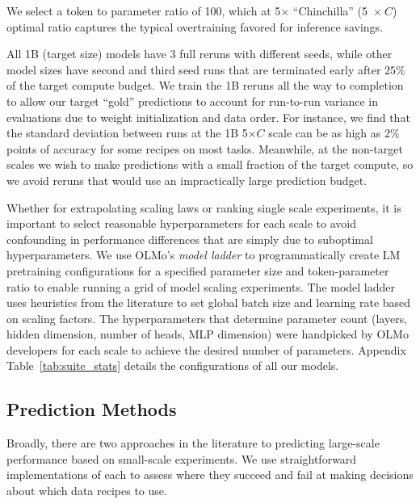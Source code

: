 \documentclass{article}
\theoremstyle{plain}
\theoremstyle{definition}
\theoremstyle{remark}
\newcommand{\numTargetSeeds}{3}
\newcommand{\predictionSeedComputePercent}{$25\%$}
\newcommand{\rankingMethod}{ranking single scale experiments}
\newcommand{\scalingLawsMethod}{extrapolating scaling laws}
\begin{document}
We select a token to parameter ratio of 100, which at 5$\times$ ``Chinchilla''  (5~$\times~C$) optimal ratio \citep{hoffmann2022trainingcomputeoptimallargelanguage} captures the typical overtraining favored for inference savings. 

All 1B (target size) models have \numTargetSeeds{} full reruns with different seeds, while other model sizes have second and third seed runs that are terminated early after \predictionSeedComputePercent{} of the target compute budget. We train the 1B reruns all the way to completion to allow our target ``gold'' predictions to account for run-to-run variance in evaluations due to weight initialization and data order. For instance, we find that the standard deviation between runs at the 1B 5$\times C$ scale can be as high as $2\%$ points of accuracy for some recipes on most tasks. Meanwhile, at the non-target scales we wish to make predictions with a small fraction of the target compute, so we avoid reruns that would use an impractically large prediction budget.

Whether for \scalingLawsMethod{} or \rankingMethod{}, it is important to select reasonable hyperparameters for each scale to avoid confounding in performance differences that are simply due to suboptimal hyperparameters. We use OLMo's \textit{model ladder} \citep{groeneveld2024olmoacceleratingsciencelanguage, olmo20252olmo2furious, bhagia2024establishingtaskscalinglaws} to programmatically create LM pretraining configurations for a specified parameter size and token-parameter ratio to enable running a grid of model scaling experiments. 
The model ladder uses heuristics from the literature \citep{Porian2024ResolvingDI} to set global batch size and learning rate based on scaling factors. The hyperparameters that determine parameter count (layers, hidden dimension, number of heads, MLP dimension) were handpicked by OLMo developers for each scale to achieve the desired number of parameters. Appendix Table~\ref{tab:suite_stats} details the configurations of all our models.


\subsection{Prediction Methods}
\label{sec:prediction_methods}
Broadly, there are two approaches in the literature to predicting large-scale performance based on small-scale experiments. We use straightforward implementations of each to assess where they succeed and fail at making decisions about which data recipes to use.
\end{document}
